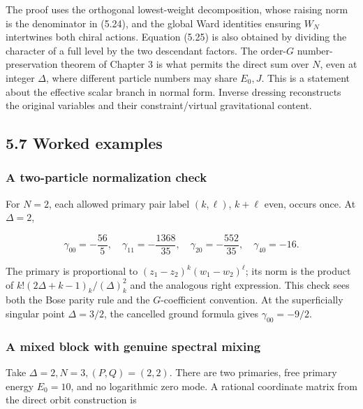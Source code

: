 The proof uses the orthogonal lowest-weight decomposition, whose raising norm is the denominator in (5.24), and the global Ward identities ensuring \(W_N\) intertwines both chiral actions. Equation (5.25) is also obtained by dividing the character of a full level by the two descendant factors. The order-\(G\) number-preservation theorem of Chapter 3 is what permits the direct sum over \(N\), even at integer \(\Delta\), where different particle numbers may share \(E_0,J\). This is a statement about the effective scalar branch in normal form. Inverse dressing reconstructs the original variables and their constraint/virtual gravitational content.

\hypertarget{worked-examples}{%
\subsection{5.7 Worked examples}\label{worked-examples}}

\hypertarget{a-two-particle-normalization-check}{%
\subsubsection{A two-particle normalization check}\label{a-two-particle-normalization-check}}

For \(N=2\), each allowed primary pair label \((k,\ell)\), \(k+\ell\) even, occurs once. At \(\Delta=2\),

\[
\gamma_{00}=-\frac{56}{5},\quad
\gamma_{11}=-\frac{1368}{35},\quad
\gamma_{20}=-\frac{552}{35},\quad
\gamma_{40}=-16.
\tag{5.27}
\]

The primary is proportional to \((z_1-z_2)^k(w_1-w_2)^\ell\); its norm is the product of \(k!(2\Delta+k-1)_k/(\Delta)_k^2\) and the analogous right expression. This check sees both the Bose parity rule and the \(G\)-coefficient convention. At the superficially singular point \(\Delta=3/2\), the cancelled ground formula gives \(\gamma_{00}=-9/2\).

\hypertarget{a-mixed-block-with-genuine-spectral-mixing}{%
\subsubsection{A mixed block with genuine spectral mixing}\label{a-mixed-block-with-genuine-spectral-mixing}}

Take \(\Delta=2,N=3,(P,Q)=(2,2)\). There are two primaries, free primary energy \(E_0=10\), and no logarithmic zero mode. A rational coordinate matrix from the direct orbit construction is

